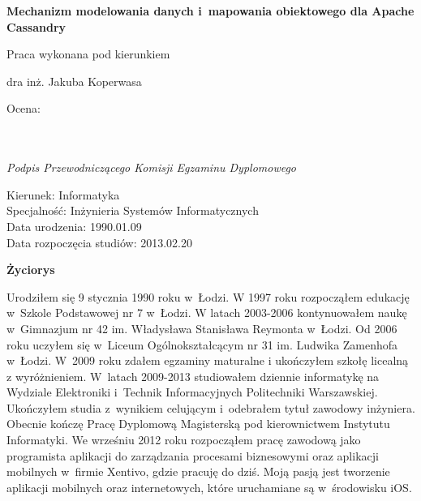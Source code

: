 \begin{titlepage}
\begin{center}
  \textbf{Mechanizm modelowania danych i~mapowania obiektowego dla Apache Cassandry}
 \end{center}
 
 \vspace{3cm}
 
 \hfill Praca wykonana pod kierunkiem
 
 \hfill dra inż. Jakuba Koperwasa
 
 \vspace{3cm}

 \begin{flushleft}
  \begin{minipage}{7cm}
   Ocena: \dotfill \\ \\
   \hspace*{0cm} \dotfill \\[-0.7cm]
   \begin{center}
    \small\textit{Podpis Przewodniczącego Komisji Egzaminu Dyplomowego}
   \end{center}
  \end{minipage}
 \end{flushleft}

\end{titlepage}


\newpage
\thispagestyle{empty}

\begin{flushright}
  Kierunek: Informatyka \\
  Specjalność: Inżynieria Systemów Informatycznych \\
  Data urodzenia: 1990.01.09 \\
  Data rozpoczęcia studiów: 2013.02.20 \\
\end{flushright}

\vspace*{3cm}

\begin{center}
  \textbf{\textbf{Życiorys}}
\end{center}
 
\vspace{1cm}

Urodziłem się 9 stycznia 1990 roku w~Łodzi. W 1997 roku rozpocząłem edukację w~Szkole Podstawowej nr 7 w~Łodzi. W latach 2003-2006 kontynuowałem naukę w~Gimnazjum nr 42 im. Władysława Stanisława Reymonta w~Łodzi. Od 2006 roku uczyłem się w~Liceum Ogólnokształcącym nr 31 im. Ludwika Zamenhofa w~Łodzi. W~2009 roku zdałem egzaminy maturalne i ukończyłem szkołę licealną z wyróżnieniem. W~latach 2009-2013 studiowałem dziennie informatykę na Wydziale Elektroniki i~Technik Informacyjnych Politechniki Warszawskiej. Ukończyłem studia z~wynikiem celującym i~odebrałem tytuł zawodowy inżyniera. Obecnie kończę Pracę Dyplomową Magisterską pod kierownictwem Instytutu Informatyki. We wrześniu 2012 roku rozpocząłem pracę zawodową jako programista aplikacji do zarządzania procesami biznesowymi oraz aplikacji mobilnych w~firmie Xentivo, gdzie pracuję do dziś. Moją pasją jest tworzenie aplikacji mobilnych oraz internetowych, które uruchamiane są w~środowisku iOS.

